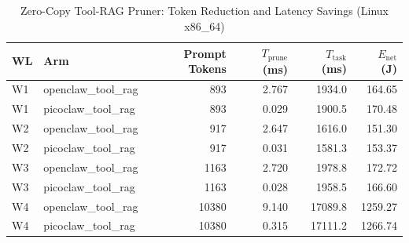 \begin{table}[t]
\centering\small
\caption{Zero-Copy Tool-RAG Pruner: Token Reduction and Latency Savings (Linux x86_64)}
\label{tab:linux_tool_rag}
\begin{tabular}{llrrrr}
\toprule
WL & Arm & Prompt Tokens & $T_{\text{prune}}$ (ms) & $T_{\text{task}}$ (ms) & $E_{\text{net}}$ (J) \\
\midrule
W1 & openclaw\_tool\_rag & 893 & 2.767 & 1934.0 & 164.65 \\
W1 & picoclaw\_tool\_rag & 893 & 0.029 & 1900.5 & 170.48 \\
W2 & openclaw\_tool\_rag & 917 & 2.647 & 1616.0 & 151.30 \\
W2 & picoclaw\_tool\_rag & 917 & 0.031 & 1581.3 & 153.37 \\
W3 & openclaw\_tool\_rag & 1163 & 2.720 & 1978.8 & 172.72 \\
W3 & picoclaw\_tool\_rag & 1163 & 0.028 & 1958.5 & 166.60 \\
W4 & openclaw\_tool\_rag & 10380 & 9.140 & 17089.8 & 1259.27 \\
W4 & picoclaw\_tool\_rag & 10380 & 0.315 & 17111.2 & 1266.74 \\
\bottomrule
\end{tabular}
\end{table}

